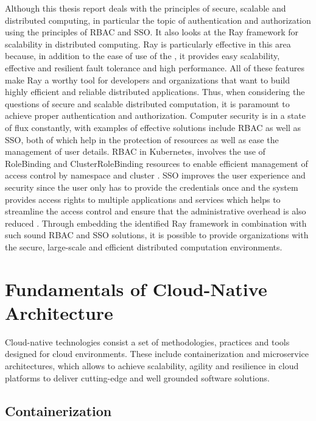 Although this thesis report deals with the principles of secure, scalable and distributed computing, in particular the topic of authentication and authorization using the principles of RBAC and SSO. It also looks at the Ray framework for scalability in distributed computing. Ray is particularly effective in this area because, in addition to the ease of use of the , it provides easy scalability, effective and resilient fault tolerance and high performance. All of these features make Ray a worthy tool for developers and organizations that want to build highly efficient and reliable distributed applications. Thus, when considering the questions of secure and scalable distributed computation, it is paramount to achieve proper authentication and authorization. Computer security is in a state of flux constantly, with examples of effective solutions include RBAC as well as SSO, both of which help in the protection of resources as well as ease the management of user details. RBAC in Kubernetes, involves the use of RoleBinding and ClusterRoleBinding resources to enable efficient management of access control by namespace and cluster \cite{burns2022Kubernetes}. SSO improves the user experience and security since the user only has to provide the credentials once and the system provides access rights to multiple applications and services which helps to streamline the access control and ensure that the administrative overhead is also reduced \cite{jangda2020sso}. Through embedding the identified Ray framework in combination with such sound RBAC and SSO solutions, it is possible to provide organizations with the secure, large-scale and efficient distributed computation environments. \cite{zaharia2012resilient, moritz}


\section{Fundamentals of Cloud-Native Architecture}

Cloud-native technologies consist a set of methodologies, practices and tools designed for cloud environments. These include containerization and microservice architectures, which allows to achieve scalability, agility and resilience in cloud platforms to deliver cutting-edge and well grounded software solutions. \cite{r16}

\subsection{Containerization}

